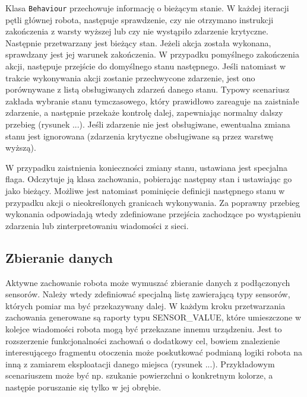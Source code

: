 Klasa {\tt Behaviour} przechowuje informację o bieżącym stanie. W każdej iteracji pętli głównej robota, następuje sprawdzenie, czy nie otrzymano instrukcji zakończenia z warsty wyższej lub czy nie wystąpiło zdarzenie krytyczne. Następnie przetwarzany jest bieżący stan. Jeżeli akcja została wykonana, sprawdzany jest jej warunek zakończenia. W przypadku pomyślnego zakończenia akcji, następuje przejście do domyślnego stanu następnego. Jeśli natomiast w trakcie wykonywania akcji zostanie przechwycone zdarzenie, jest ono porównywane z listą obsługiwanych zdarzeń danego stanu. Typowy scenariusz zakłada wybranie stanu tymczasowego, który prawidłowo zareaguje na zaistniałe zdarzenie, a następnie przekaże kontrolę dalej, zapewniając normalny dalszy przebieg (rysunek ...). Jeśli zdarzenie nie jest obsługiwane, ewentualna zmiana stanu jest ignorowana (zdarzenia krytyczne obsługiwane są przez warstwę wyższą).


W przypadku zaistnienia konieczności zmiany stanu, ustawiana jest specjalna flaga. Odczytuje ją klasa zachowania, pobierając następny stan i ustawiając go jako bieżący. Możliwe jest natomiast pominięcie definicji następnego stanu w przypadku akcji o nieokreślonych granicach wykonywania. Za poprawny przebieg wykonania odpowiadają wtedy zdefiniowane przejścia zachodzące po wystąpieniu zdarzenia lub zinterpretowaniu wiadomości z sieci.



\subsection{Zbieranie danych}

Aktywne zachowanie robota może wymuszać zbieranie danych z podłączonych sensorów. Należy wtedy zdefiniować specjalną listę zawierającą typy sensorów, których pomiar ma być przekazywany dalej. W każdym kroku przetwarzania zachowania generowane są raporty typu SENSOR\_VALUE, które umieszczone w kolejce wiadomości robota mogą być przekazane innemu urządzeniu. Jest to rozszerzenie funkcjonalności zachowań o dodatkowy cel, bowiem znalezienie interesującego fragmentu otoczenia może poskutkować podmianą logiki robota na inną z zamiarem eksploatacji danego miejsca (rysunek ...). Przykładowym scenariuszem może być np. szukanie powierzchni o konkretnym kolorze, a następie poruszanie się tylko w jej obrębie.


